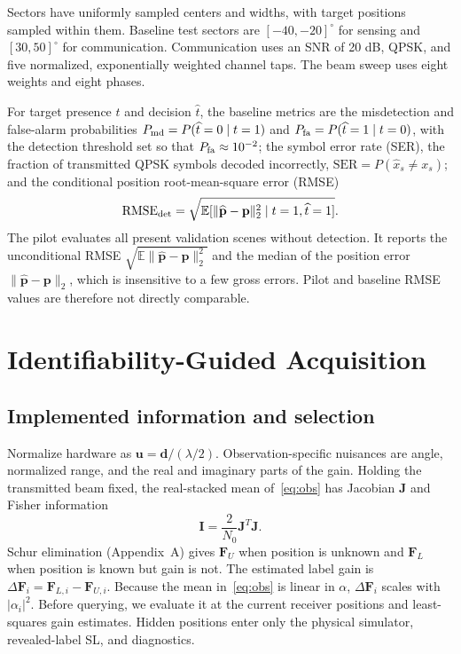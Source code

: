 \documentclass[conference]{IEEEtran}
\newcommand{\E}{\mathbb{E}}
\newcommand{\F}{\mathbf{F}}
\newcommand{\J}{\mathbf{J}}
\begin{document}
Sectors have uniformly sampled centers and widths, with target positions sampled within them. Baseline test sectors are $[-40,-20]^\circ$ for sensing and $[30,50]^\circ$ for communication. Communication uses an SNR of 20 dB, QPSK, and five normalized, exponentially weighted channel taps. The beam sweep uses eight weights and eight phases.

For target presence $t$ and decision $\widehat t$, the baseline metrics are the misdetection and false-alarm probabilities $P_{\rm md}=P(\widehat t=0\mid t=1)$ and $P_{\rm fa}=P(\widehat t=1\mid t=0)$, with the detection threshold set so that $P_{\rm fa}\approx10^{-2}$; the symbol error rate (SER), the fraction of transmitted QPSK symbols decoded incorrectly, $\mathrm{SER}=P(\widehat x_s\neq x_s)$; and the conditional position root-mean-square error (RMSE)
\begin{equation}
 {\rm RMSE}_{\rm det}=
 \sqrt{\E[\|\widehat{\mathbf p}-\mathbf p\|_2^2\mid t=1,\widehat t=1]}.
\end{equation}
The pilot evaluates all present validation scenes without detection. It reports the unconditional RMSE $\sqrt{\E\|\widehat{\mathbf p}-\mathbf p\|_2^2}$ and the median of the position error $\|\widehat{\mathbf p}-\mathbf p\|_2$, which is insensitive to a few gross errors. Pilot and baseline RMSE values are therefore not directly comparable.

\section{Identifiability-Guided Acquisition}
\subsection{Implemented information and selection}
Normalize hardware as $\mathbf u=\mathbf d/(\lambda/2)$. Observation-specific nuisances are angle, normalized range, and the real and imaginary parts of the gain. Holding the transmitted beam fixed, the real-stacked mean of~\eqref{eq:obs} has Jacobian $\J$ and Fisher information
\begin{equation}
 \mathbf I=\frac{2}{N_0}\J^T\J.
\end{equation}
Schur elimination (Appendix~A) gives $\F_U$ when position is unknown and $\F_L$ when position is known but gain is not. The estimated label gain is $\Delta\F_i=\F_{L,i}-\F_{U,i}$. Because the mean in~\eqref{eq:obs} is linear in $\alpha$, $\Delta\F_i$ scales with $|\alpha_i|^2$. Before querying, we evaluate it at the current receiver positions and least-squares gain estimates. Hidden positions enter only the physical simulator, revealed-label SL, and diagnostics.
\end{document}

